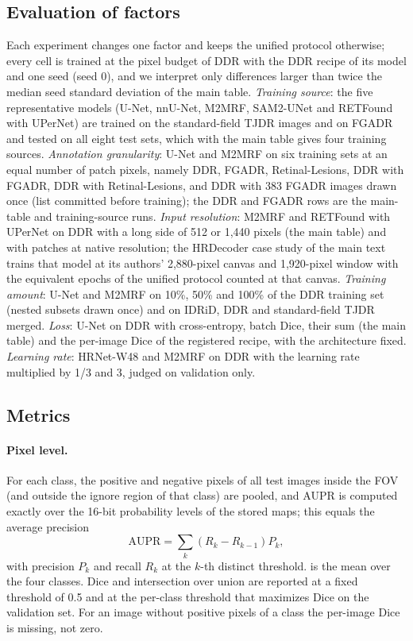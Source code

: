 \subsection{Evaluation of factors}
Each experiment changes one factor and keeps the unified protocol otherwise; every cell is trained at the pixel budget of DDR with the DDR recipe of its model and one seed (seed 0), and we interpret only differences larger than twice the median seed standard deviation of the main table. \emph{Training source}: the five representative models (U-Net, nnU-Net, M2MRF, SAM2-UNet and RETFound with UPerNet) are trained on the standard-field TJDR images and on FGADR and tested on all eight test sets, which with the main table gives four training sources. \emph{Annotation granularity}: U-Net and M2MRF on six training sets at an equal number of patch pixels, namely DDR, FGADR, Retinal-Lesions, DDR with FGADR, DDR with Retinal-Lesions, and DDR with 383 FGADR images drawn once (list committed before training); the DDR and FGADR rows are the main-table and training-source runs. \emph{Input resolution}: M2MRF and RETFound with UPerNet on DDR with a long side of 512 or 1,440 pixels (the main table) and with patches at native resolution; the HRDecoder case study of the main text trains that model at its authors' 2,880-pixel canvas and 1,920-pixel window with the equivalent epochs of the unified protocol counted at that canvas. \emph{Training amount}: U-Net and M2MRF on 10\%, 50\% and 100\% of the DDR training set (nested subsets drawn once) and on IDRiD, DDR and standard-field TJDR merged. \emph{Loss}: U-Net on DDR with cross-entropy, batch Dice, their sum (the main table) and the per-image Dice of the registered recipe, with the architecture fixed. \emph{Learning rate}: HRNet-W48 and M2MRF on DDR with the learning rate multiplied by 1/3 and 3, judged on validation \mAUPR{} only.

\subsection{Metrics}
\paragraph{Pixel level.} For each class, the positive and negative pixels of all test images inside the FOV (and outside the ignore region of that class) are pooled, and AUPR is computed exactly over the 16-bit probability levels of the stored maps; this equals the average precision
\begin{equation}
\mathrm{AUPR}=\sum_{k}\left(R_k-R_{k-1}\right)P_k ,
\end{equation}
with precision $P_k$ and recall $R_k$ at the $k$-th distinct threshold. \mAUPR{} is the mean over the four classes. Dice and intersection over union are reported at a fixed threshold of 0.5 and at the per-class threshold that maximizes Dice on the validation set. For an image without positive pixels of a class the per-image Dice is missing, not zero.

